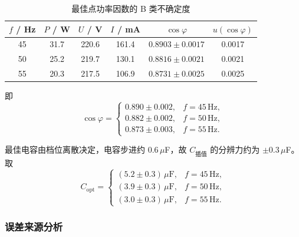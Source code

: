 \documentclass{Phyport}
\begin{document}
\begin{table}[H]
    \centering
    \caption{最佳点功率因数的 B 类不确定度}
    \label{tab:u}
    \begin{tabular}{cccccc}
        \toprule
        $f$ / Hz & $P$ / W & $U$ / V & $I$ / mA & $\cos\varphi$ & $u(\cos\varphi)$ \\
        \midrule
        45 & 31.7 & 220.6 & 161.4 & $0.8903\pm0.0017$ & 0.0017 \\
        50 & 25.2 & 219.7 & 130.1 & $0.8816\pm0.0021$ & 0.0021 \\
        55 & 20.3 & 217.5 & 106.9 & $0.8731\pm0.0025$ & 0.0025 \\
        \bottomrule
    \end{tabular}
\end{table}

即
\begin{equation}
    \cos\varphi=
    \begin{cases}
        0.890\pm0.002, & f=45\,\mathrm{Hz},\\
        0.882\pm0.002, & f=50\,\mathrm{Hz},\\
        0.873\pm0.003, & f=55\,\mathrm{Hz}.
    \end{cases}
\end{equation}

最佳电容由档位离散决定，电容步进约 0.6\,$\mu$F，故 $C_{\text{插值}}$ 的分辨力约为 $\pm0.3\,\mu$F。取
\begin{equation}
    C_{\text{opt}}=
    \begin{cases}
        (5.2\pm0.3)\,\mu\mathrm{F}, & f=45\,\mathrm{Hz},\\
        (3.9\pm0.3)\,\mu\mathrm{F}, & f=50\,\mathrm{Hz},\\
        (3.0\pm0.3)\,\mu\mathrm{F}, & f=55\,\mathrm{Hz}.
    \end{cases}
\end{equation}

\subsubsection{误差来源分析}
\end{document}

